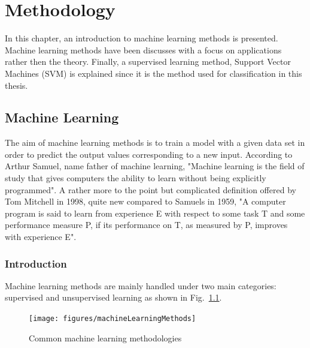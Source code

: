 \chapter{Methodology}

In this chapter, an introduction to machine learning methods is presented. 
Machine learning methods have been discusses with a focus on applications rather then the theory.
Finally, a supervised learning method, Support Vector Machines (SVM) is explained since it is the method used for classification in this thesis.

\section{Machine Learning}

The aim of machine learning methods is to train a model with a given data set in order to predict the output values corresponding to a new input. 
According to Arthur Samuel, name father of machine learning, "Machine learning is the field of study that gives computers the ability to learn without being explicitly programmed". 
A rather more to the point but complicated definition offered by Tom Mitchell in 1998, quite new compared to Samuel\textquotesingle s in 1959, "A computer program is said to learn from experience E with respect to some task T and some performance measure P, if its performance on T, as measured by P, improves with experience E".

\subsection{Introduction}
Machine learning methods are mainly handled under two main categories: supervised and unsupervised learning as shown in Fig.~\ref{fig:machineLearningMethods}. 

\begin{figure}
\begin{center}
\texttt{[image: figures/machineLearningMethods]}    %
\caption{Common machine learning methodologies} 
\label{fig:machineLearningMethods}
\end{center}
\end{figure}

